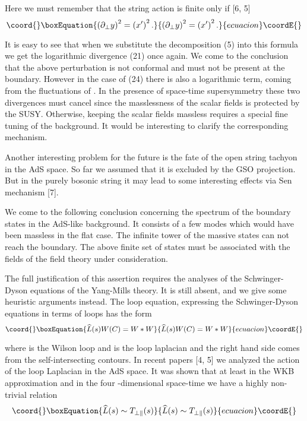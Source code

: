 \documentclass[a4paper,12pt]{article}
\begin{document}
Here we must remember that the string action is finite only if [6, 5] 
\begin{equation}\coord{}\boxEquation{
\left( \partial _{\bot }y\right) ^{2}=\left( x'\right) ^{2}.
}{
\left( \partial _{\bot }y\right) ^{2}=\left( x'\right) ^{2}.
}{ecuacion}\coordE{}\end{equation}

It is easy to see that when we substitute the decomposition (5) into this
formula we get the logarithmic divergence (21) once again. We come to the
conclusion that the above perturbation is not conformal and must not be
present at the boundary. However in the case of (24) there is also a
logarithmic term, coming from the fluctuations of \coordHE{}. In the
presence of space-time supersymmetry these two divergences must cancel since
the masslessness of the scalar fields is protected by the SUSY. Otherwise,
keeping the scalar fields massless requires a special fine tuning of the
background. It would be interesting to clarify the corresponding mechanism.%
\newline

Another interesting problem for the future is the fate of the open string
tachyon in the AdS space. So far we assumed that it is excluded by the GSO
projection. But in the purely bosonic string it may lead to some
interesting effects via Sen mechanism [7].

We come to the following conclusion concerning the spectrum of the boundary
states in the AdS-like background. It consists of a few modes which would
have been massless in the flat case. The infinite tower of the massive
states can not reach the boundary. The above finite set of states must be
associated with the fields of the field theory under consideration.

The full justification of this assertion requires the analyses of the
Schwinger-Dyson equations of the Yang-Mills theory. It is still absent, and
we give some heuristic arguments instead. The loop equation, expressing the
Schwinger-Dyson equations in terms of loops has the form 
\begin{equation}\coord{}\boxEquation{
\widehat{L}(s)W(C)=W\ast W
}{
\widehat{L}(s)W(C)=W\ast W
}{ecuacion}\coordE{}\end{equation}

where \coordHE{} is the Wilson loop and \coordHE{} is the loop laplacian and
the right hand side comes from the self-intersecting contours. In recent
papers [4, 5] we analyzed the action of the loop Laplacian in the AdS space.
It was shown that at least in the WKB approximation and in the four
-dimensional space-time we have a highly non-trivial relation 
\begin{equation}\coord{}\boxEquation{
\widehat{L}(s)\sim T_{\bot \Vert }(s)
}{
\widehat{L}(s)\sim T_{\bot \Vert }(s)
}{ecuacion}\coordE{}\end{equation}
\end{document}
